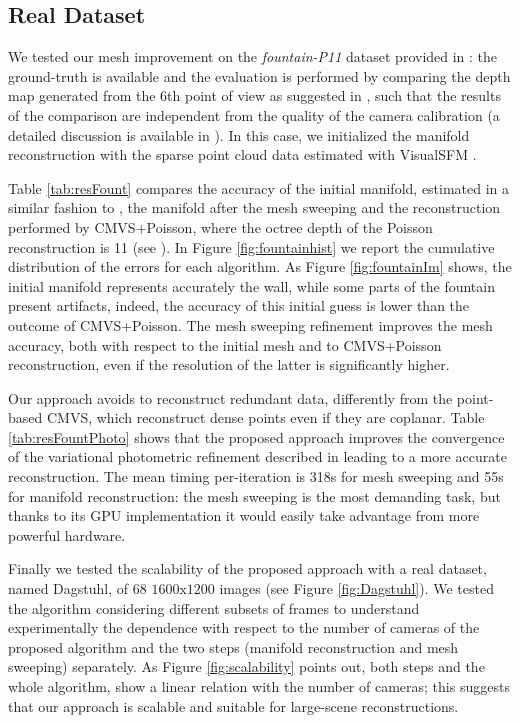 \subsection{Real Dataset}
We tested our mesh improvement on the \emph{fountain-P11} dataset provided in \cite{strecha2008}: the ground-truth is available and the evaluation is performed by comparing the depth map generated from the 6th point of view as suggested in  \cite{strecha2008}, such that the results of the comparison are independent from the quality of the camera calibration (a detailed discussion is available in \cite{strecha2008}).
In this case, we initialized the manifold reconstruction with the sparse point cloud data estimated with VisualSFM \cite{wu2011visualsfm}. 


Table \ref{tab:resFount} compares the accuracy of the initial manifold, estimated in a similar fashion to \cite{romanoni15b}, the manifold after the mesh sweeping and the reconstruction performed by CMVS+Poisson, where the octree depth of the Poisson reconstruction is 11 (see \cite{kazhdan2006poisson}). 
In Figure \ref{fig:fountainhist} we report the cumulative distribution of the errors for each algorithm.
As Figure \ref{fig:fountainIm} shows, the initial manifold represents accurately the wall, while some parts of the fountain present artifacts, indeed, the accuracy of this initial guess is lower than the outcome of CMVS+Poisson.
The mesh sweeping refinement improves the mesh accuracy, both with respect to the initial mesh and to CMVS+Poisson reconstruction, even if the resolution of the latter is significantly higher. 

Our approach avoids to reconstruct redundant data, differently from the point-based CMVS, which reconstruct dense points even if they are coplanar.
Table \ref{tab:resFountPhoto} shows that the proposed approach improves the convergence of the variational photometric refinement described in \cite{vu_et_al_2012} leading to a more accurate reconstruction. 
The mean timing per-iteration is 318s for mesh sweeping and 55s for manifold reconstruction: the mesh sweeping is the most demanding task, but thanks to its GPU implementation it would easily take advantage from more powerful hardware.

Finally we tested the scalability of the proposed approach with a real dataset, named Dagstuhl, of 68 $1600\text{x}1200$ images (see Figure \ref{fig:Dagstuhl}). 
We tested the algorithm considering different subsets of frames to understand experimentally the dependence with respect to the number of cameras of the proposed algorithm and the two steps (manifold reconstruction and mesh sweeping) separately. 
As Figure \ref{fig:scalability} points out, both steps and the whole algorithm, show a linear relation with the number of cameras; this suggests that our approach is scalable and suitable for large-scene reconstructions.



